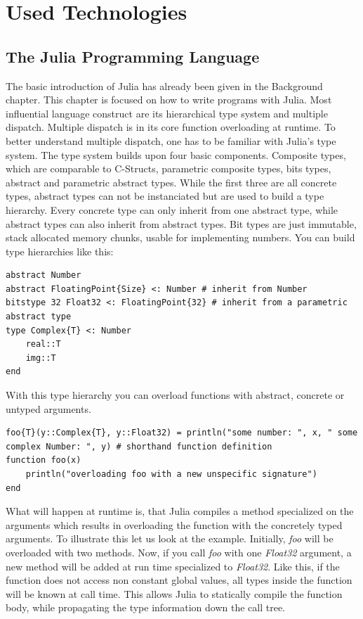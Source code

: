\section{Used Technologies}

\subsection{The Julia Programming Language}

The basic introduction of Julia has already been given in the Background chapter.
This chapter is focused on how to write programs with Julia.
Most influential language construct are its hierarchical type system and multiple dispatch.
Multiple dispatch is in its core function overloading at runtime. 
To better understand multiple dispatch, one has to be familiar with Julia's type system.
The type system builds upon four basic components. 
Composite types, which are comparable to C-Structs, parametric composite types, bits types, abstract and parametric abstract types.
While the first three are all concrete types, abstract types can not be instanciated but are used to build a type hierarchy.
Every concrete type can only inherit from one abstract type, while abstract types can also inherit from abstract types.
Bit types are just immutable, stack allocated memory chunks, usable for implementing numbers.
You can build type hierarchies like this:
\begin{lstlisting}
abstract Number
abstract FloatingPoint{Size} <: Number # inherit from Number
bitstype 32 Float32 <: FloatingPoint{32} # inherit from a parametric abstract type
type Complex{T} <: Number
    real::T
    img::T
end
\end{lstlisting}

With this type hierarchy you can overload functions with abstract, concrete or untyped arguments.

\begin{lstlisting}
foo{T}(y::Complex{T}, y::Float32) = println("some number: ", x, " some complex Number: ", y) # shorthand function definition
function foo(x)
    println("overloading foo with a new unspecific signature")
end
\end{lstlisting}

What will happen at runtime is, that Julia compiles a method specialized on the arguments which results in overloading the function with the concretely typed arguments.
To illustrate this let us look at the example. 
Initially, \textit{foo} will be overloaded with two methods.
Now, if you call \textit{foo} with one \textit{Float32} argument, a new method will be added at run time specialized to \textit{Float32}.
Like this, if the function does not access non constant global values, all types inside the function will be known at call time.
This allows Julia to statically compile the function body, while propagating the type information down the call tree.

